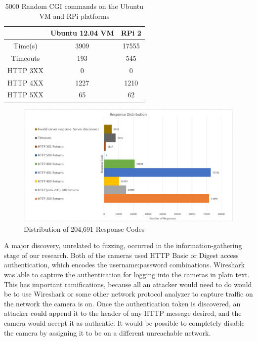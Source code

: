 \documentclass[letterpaper,twocolumn,10pt]{article}
\begin{document}
\begin{table}[h]
\centering
	\begin{tabular}{ |c|c|c| }
		\hline
		~ & Ubuntu 12.04 VM & RPi 2\\
		\hline
		\hline
		Time(s) & 3909 & 17555 \\
		Timeouts & 193 & 545  \\
		HTTP 3XX & 0 & 0 \\
		HTTP 4XX & 1227 & 1210 \\
		HTTP 5XX & 65 & 62 \\
		\hline
	\end{tabular}
	\caption{5000 Random CGI commands on the Ubuntu VM and RPi platforms}
	\label{tab:VMvsPi} 
\end{table}

\begin{figure}[h]
	\centering
	\includegraphics[width=2\linewidth]{dist}
	\caption{Distribution of 204,691 Response Codes}
	\label{fig:dist}
\end{figure}

A major discovery, unrelated to fuzzing, occurred in the information-gathering stage of our research. Both of the cameras used HTTP Basic or Digest access authentication, which encodes the username:password combinations. Wireshark was able to capture the authentication for logging into the cameras in plain text. This has important ramifications, because all an attacker would need to do would be to use Wireshark or some other network protocol analyzer to capture traffic on the network the camera is on. Once the authentication token is discovered, an attacker could append it to the header of any HTTP message desired, and the camera would accept it as authentic. It would be possible to completely disable the camera by assigning it to be on a different unreachable network. 
\end{document}
